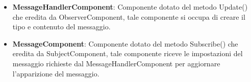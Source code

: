 \begin{itemize}
\begin{itemize}
        \item \textbf{ngOnInit()}: Metodo che si occupa si settare il parametro loadingStatus a False.
        \item \textbf{setStatus()}: Metodo che imposta il valore del parametro loadingStatus.
    \end{itemize}
    \item \textbf{MessageHandlerComponent}: Componente dotato del metodo Update() che eredita da ObserverComponent, tale componente si occupa di creare il tipo e contenuto del messaggio.
    \item \textbf{MessageComponent}: Componente dotato del metodo Subscribe() che eredita da SubjectComponent, tale componente riceve le impostazioni del messaggio richieste dal MessageHandlerComponent per aggiornare l'apparizione del messaggio.
\end{itemize}
